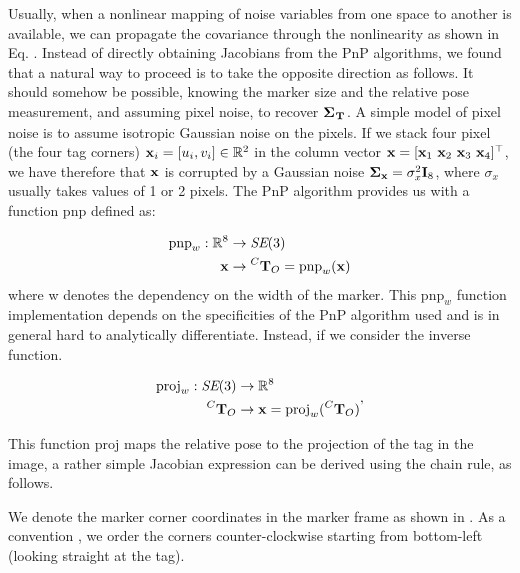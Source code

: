 Usually, when a nonlinear mapping of noise variables from one space to another is available, we can propagate the covariance through the nonlinearity
as shown in Eq. . 
Instead of directly obtaining Jacobians from the PnP algorithms, we found that a natural way to proceed is to take the opposite 
direction as follows. It should somehow be possible, knowing the marker size and the relative pose measurement, and assuming pixel noise, to
recover ${\bm \Sigma}_{\prescript{}{}{{\bf T}}_{}}$. A simple model of pixel noise is to assume isotropic Gaussian noise on the pixels. If we stack four pixel (the four tag corners) 
${\bf x}_i = [u_i, v_i] \in \mathbb{R}^2$ in the column vector ${\bf x} = [{\bf x}_1~{\bf x}_2~{\bf x}_3~{\bf x}_4]^{\top}$, we have therefore that
${\bf x}$ is corrupted by a Gaussian noise ${\bm \Sigma}_{{\bf x}} = \sigma_{x}^2 {\bf I}_8$, where $\sigma_{x}$ usually takes values of 1 or 2 pixels.
The PnP algorithm provides us with a function $\text{pnp}$ defined as:

\begin{equation}
    \begin{split}
        \text{pnp}_w: \mathbb{R}^8 &\rightarrow \textit{SE}(3) \\
                           {\bf x} &\rightarrow \prescript{C}{}{{\bf T}}_{O} = \text{pnp}_w({\bf x})
    \end{split}
\end{equation}
%
where w denotes the dependency on the width of the marker. This $\text{pnp}_w$ function implementation depends on the specificities of the PnP algorithm used and  
is in general hard to analytically differentiate. Instead, if we consider the inverse function.

\begin{equation}
    \begin{split}
        \text{proj}_w: \textit{SE}(3) &\rightarrow \mathbb{R}^8 \\
                           \prescript{C}{}{{\bf T}}_{O} &\rightarrow {\bf x} = \text{proj}_w(\prescript{C}{}{{\bf T}}_{O})
    \end{split},
\end{equation}

This function $\text{proj}$ maps the relative pose to the projection of the tag in the image, a rather simple Jacobian expression can be derived using the chain rule, as follows.

We denote the marker corner coordinates in the marker frame as shown in . As a convention 
\cite{wang2016iros}, we order the corners counter-clockwise starting from bottom-left (looking straight at the tag). 

